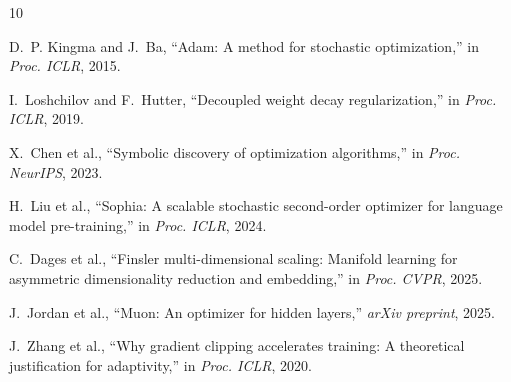 \documentclass[11pt,a4paper,twocolumn]{article}
\begin{document}
\begin{thebibliography}{10}

D.~P. Kingma and J.~Ba, ``Adam: A method for stochastic optimization,'' in \emph{Proc. ICLR}, 2015.

I.~Loshchilov and F.~Hutter, ``Decoupled weight decay regularization,'' in \emph{Proc. ICLR}, 2019.

X.~Chen et al., ``Symbolic discovery of optimization algorithms,'' in \emph{Proc. NeurIPS}, 2023.

H.~Liu et al., ``Sophia: A scalable stochastic second-order optimizer for language model pre-training,'' in \emph{Proc. ICLR}, 2024.

C.~Dages et al., ``Finsler multi-dimensional scaling: Manifold learning for asymmetric dimensionality reduction and embedding,'' in \emph{Proc. CVPR}, 2025.

J.~Jordan et al., ``Muon: An optimizer for hidden layers,'' \emph{arXiv preprint}, 2025.

J.~Zhang et al., ``Why gradient clipping accelerates training: A theoretical justification for adaptivity,'' in \emph{Proc. ICLR}, 2020.

\end{thebibliography}
\end{document}
